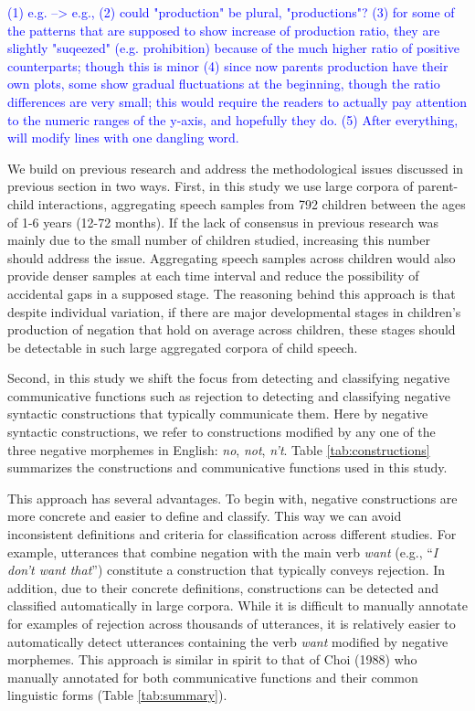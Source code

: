 \documentclass[
  english,
  man,floatsintext]{apa6}
\begin{document}
\textcolor{blue}{(1) e.g. --> e.g.,}
\textcolor{blue}{(2) could "production" be plural, "productions"?}
\textcolor{blue}{(3) for some of the patterns that are supposed to show increase of production ratio, they are slightly "suqeezed" (e.g. prohibition) because of the much higher ratio of positive counterparts; though this is minor}
\textcolor{blue}{(4) since now parents production have their own plots, some show gradual fluctuations at the beginning, though the ratio differences are very small; this would require the readers to actually pay attention to the numeric ranges of the y-axis, and hopefully they do.}
\textcolor{blue}{(5) After everything, will modify lines with one dangling word.}

We build on previous research and address the methodological issues discussed in previous section in two ways. First, in this study we use large corpora of parent-child interactions, aggregating speech samples from 792 children between the ages of 1-6 years (12-72 months). If the lack of consensus in previous research was mainly due to the small number of children studied, increasing this number should address the issue. Aggregating speech samples across children would also provide denser samples at each time interval and reduce the possibility of accidental gaps in a supposed stage. The reasoning behind this approach is that despite individual variation, if there are major developmental stages in children's production of negation that hold on average across children, these stages should be detectable in such large aggregated corpora of child speech.

Second, in this study we shift the focus from detecting and classifying negative communicative functions such as rejection to detecting and classifying negative syntactic constructions that typically communicate them. Here by negative syntactic constructions, we refer to constructions modified by any one of the three negative morphemes in English: \emph{no}, \emph{not}, \emph{n't}. Table \ref{tab:constructions} summarizes the constructions and communicative functions used in this study.

This approach has several advantages. To begin with, negative constructions are more concrete and easier to define and classify. This way we can avoid inconsistent definitions and criteria for classification across different studies. For example, utterances that combine negation with the main verb \emph{want} (e.g., ``\emph{I don't want that}'') constitute a construction that typically conveys rejection. In addition, due to their concrete definitions, constructions can be detected and classified automatically in large corpora. While it is difficult to manually annotate for examples of rejection across thousands of utterances, it is relatively easier to automatically detect utterances containing the verb \emph{want} modified by negative morphemes. This approach is similar in spirit to that of Choi (1988) who manually annotated for both communicative functions and their common linguistic forms (Table \ref{tab:summary}).
\end{document}
